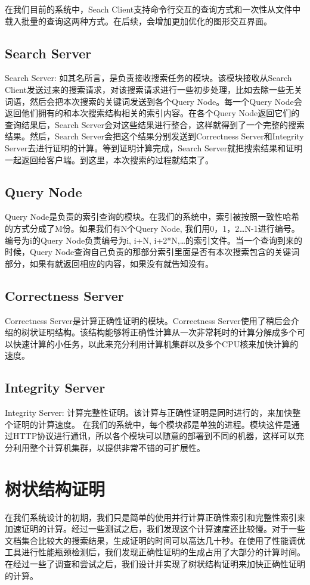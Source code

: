 在我们目前的系统中，Seach Client支持命令行交互的查询方式和一次性从文件中载入批量的查询这两种方式。在后续，会增加更加优化的图形交互界面。

\subsection{Search Server}
Search Server: 如其名所言，是负责接收搜索任务的模块。该模块接收从Search Client发送过来的搜索请求，对该搜索请求进行一些初步处理，比如去除一些无关词语，然后会把本次搜索的关键词发送到各个Query Node。每一个Query Node会返回他们拥有的和本次搜索结构相关的索引内容。在各个Query Node返回它们的查询结果后，Search Server会对这些结果进行整合，这样就得到了一个完整的搜索结果。然后，Search Server会把这个结果分别发送到Correctness Server和Integrity Server去进行证明的计算。等到证明计算完成，Search Server就把搜索结果和证明一起返回给客户端。到这里，本次搜索的过程就结束了。

\subsection{Query Node}
Query Node是负责的索引查询的模块。在我们的系统中，索引被按照一致性哈希的方式分成了M份。如果我们有N个Query Node, 我们用0，1，2…N-1进行编号。编号为i的Query Node负责编号为i, i+N, i+2*N,…的索引文件。当一个查询到来的时候，Query Node查询自己负责的那部分索引里面是否有本次搜索包含的关键词部分，如果有就返回相应的内容，如果没有就告知没有。

\subsection{Correctness Server}
Correctness Server是计算正确性证明的模块。Correctness Server使用了稍后会介绍的树状证明结构。该结构能够将正确性计算从一次非常耗时的计算分解成多个可以快速计算的小任务，以此来充分利用计算机集群以及多个CPU核来加快计算的速度。

\subsection{Integrity Server}
Integrity Server: 计算完整性证明。该计算与正确性证明是同时进行的，来加快整个证明的计算速度。
在我们的系统中，每个模块都是单独的进程。模块这件是通过HTTP协议进行通讯，所以各个模块可以随意的部署到不同的机器，这样可以充分利用整个计算机集群，以提供非常不错的可扩展性。

\section{树状结构证明}
在我们系统设计的初期，我们只是简单的使用并行计算正确性索引和完整性索引来加速证明的计算。经过一些测试之后，我们发现这个计算速度还比较慢。对于一些文档集合比较大的搜索结果，生成证明的时间可以高达几十秒。在使用了性能调优工具进行性能瓶颈检测后，我们发现正确性证明的生成占用了大部分的计算时间。在经过一些了调查和尝试之后，我们设计并实现了树状结构证明来加快正确性证明的计算。

